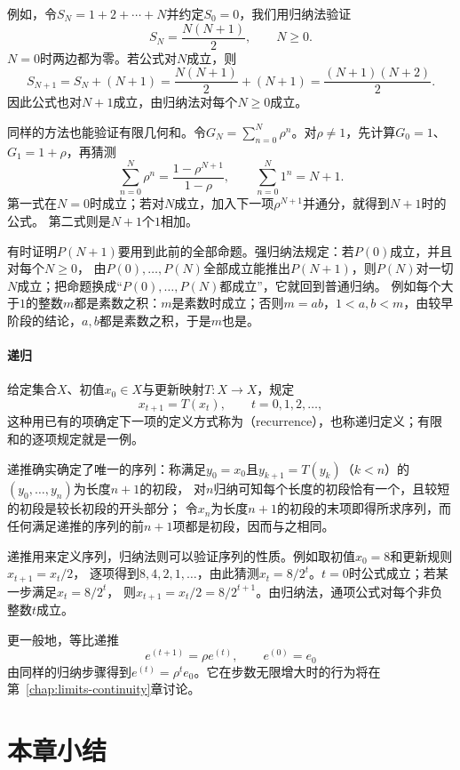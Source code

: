 例如，令$S_N=1+2+\cdots+N$并约定$S_0=0$，我们用归纳法验证
\[
 S_N=\frac{N(N+1)}2,\qquad N\geq0.
\]
$N=0$时两边都为零。若公式对$N$成立，则
\[
 S_{N+1}=S_N+(N+1)=\frac{N(N+1)}2+(N+1)=\frac{(N+1)(N+2)}2.
\]
因此公式也对$N+1$成立，由归纳法对每个$N\geq0$成立。

同样的方法也能验证有限几何和。令$G_N=\sum_{n=0}^N\rho^n$。对$\rho\neq1$，先计算$G_0=1$、$G_1=1+\rho$，再猜测
\begin{equation}
 \sum_{n=0}^{N}\rho^n=\frac{1-\rho^{N+1}}{1-\rho},\qquad
 \sum_{n=0}^{N}1^n=N+1.
 \label{eq:prelim-finite-geometric-sum}
\end{equation}
第一式在$N=0$时成立；若对$N$成立，加入下一项$\rho^{N+1}$并通分，就得到$N+1$时的公式。
第二式则是$N+1$个$1$相加。

有时证明$P(N+1)$要用到此前的全部命题。强归纳法规定：若$P(0)$成立，并且对每个$N\geq0$，
由$P(0),\ldots,P(N)$全部成立能推出$P(N+1)$，则$P(N)$对一切$N$成立；把命题换成“$P(0),\ldots,P(N)$都成立”，它就回到普通归纳。
例如每个大于$1$的整数$m$都是素数之积：$m$是素数时成立；否则$m=ab$，$1<a,b<m$，由较早阶段的结论，$a,b$都是素数之积，于是$m$也是。

\paragraph{递归}
给定集合$X$、初值$x_0\in X$与更新映射$T:X\to X$，规定
\[
 x_{t+1}=T(x_t),\qquad t=0,1,2,\ldots,
\]
这种用已有的项确定下一项的定义方式称为（recurrence），也称递归定义；有限和的逐项规定就是一例。

递推确实确定了唯一的序列：称满足$y_0=x_0$且$y_{k+1}=T(y_k)$（$k<n$）的$(y_0,\ldots,y_n)$为长度$n+1$的初段，
对$n$归纳可知每个长度的初段恰有一个，且较短的初段是较长初段的开头部分；
令$x_n$为长度$n+1$的初段的末项即得所求序列，而任何满足递推的序列的前$n+1$项都是初段，因而与之相同。


递推用来定义序列，归纳法则可以验证序列的性质。例如取初值$x_0=8$和更新规则$x_{t+1}=x_t/2$，
逐项得到$8,4,2,1,\ldots$，由此猜测$x_t=8/2^t$。$t=0$时公式成立；若某一步满足$x_t=8/2^t$，
则$x_{t+1}=x_t/2=8/2^{t+1}$。由归纳法，通项公式对每个非负整数$t$成立。


更一般地，等比递推
\begin{equation}
 e^{(t+1)}=\rho e^{(t)},\qquad e^{(0)}=e_0
 \label{eq:prelim-geometric-recurrence}
\end{equation}
由同样的归纳步骤得到$e^{(t)}=\rho^te_0$。它在步数无限增大时的行为将在第~\ref{chap:limits-continuity}章讨论。

\section{本章小结}
\label{sec:prelim-sets-functions-summary}

